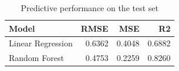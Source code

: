 \begin{table}[H]
\caption{Predictive performance on the test set}
\label{tab:perf}
\begin{tabular}{lrrr}
\toprule
Model & RMSE & MSE & R2 \\
\midrule
Linear Regression & 0.6362 & 0.4048 & 0.6882 \\
Random Forest & 0.4753 & 0.2259 & 0.8260 \\
\bottomrule
\end{tabular}
\end{table}
